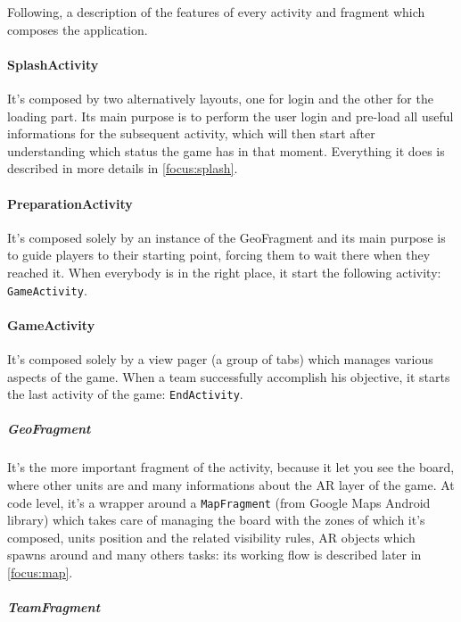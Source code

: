 		Following, a description of the features of every activity and fragment which composes the application.
		
		\paragraph{SplashActivity}
		
		It's composed by two alternatively layouts, one for login and the other for the loading part.
		Its main purpose is to perform the user login and pre-load all useful informations for the subsequent activity, which will then start after understanding which status the game has in that moment.
		Everything it does is described in more details in \autoref{focus:splash}.
		
		\paragraph{PreparationActivity}
		
		It's composed solely by an instance of the GeoFragment and its main purpose is to guide players to their starting point, forcing them to wait there when they reached it. When everybody is in the right place, it start the following activity: \lstinline|GameActivity|.
		
		\paragraph{GameActivity}
			
		It's composed solely by a view pager (a group of tabs) which manages various aspects of the game.
		When a team successfully accomplish his objective, it starts the last activity of the game: \lstinline|EndActivity|.
		
			\subparagraph{GeoFragment}
			
			It's the more important fragment of the activity, because it let you see the board, where other units are and many informations about the AR layer of the game.
			At code level, it's a wrapper around a \lstinline|MapFragment| (from Google Maps Android library) which takes care of managing the board with the zones of which it's composed, units position and the related visibility rules, AR objects which spawns around and many others tasks: its working flow is described later in \autoref{focus:map}.
			
			\subparagraph{TeamFragment}
			
